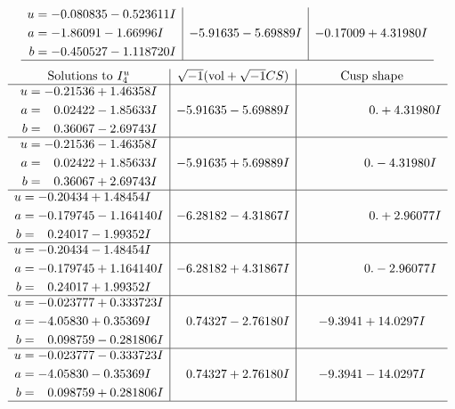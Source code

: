 \documentclass[1p]{elsarticle_modified}
\theoremstyle{definition}
\newcommand{\I}{\sqrt{-1}}
\begin{document}
$$\begin{array}{c|c|c}
\begin{aligned}
u &= -0.080835 - 0.523611 I \\
a &= -1.86091 - 1.66996 I \\
b &= -0.450527 - 1.118720 I\end{aligned}
 & -5.91635 - 5.69889 I & -0.17009 + 4.31980 I\\
 \hline 
 \end{array}$$\newpage$$\begin{array}{c|c|c}  
\text{Solutions to }I^u_{4}& \I (\text{vol} + \sqrt{-1}CS) & \text{Cusp shape}\\
 \hline 
\begin{aligned}
u &= -0.21536 + 1.46358 I \\
a &= \phantom{-}0.02422 - 1.85633 I \\
b &= \phantom{-}0.36067 - 2.69743 I\end{aligned}
 & -5.91635 - 5.69889 I & \phantom{-0.000000 -}0. + 4.31980 I \\ \hline\begin{aligned}
u &= -0.21536 - 1.46358 I \\
a &= \phantom{-}0.02422 + 1.85633 I \\
b &= \phantom{-}0.36067 + 2.69743 I\end{aligned}
 & -5.91635 + 5.69889 I & \phantom{-0.000000 } 0. - 4.31980 I \\ \hline\begin{aligned}
u &= -0.20434 + 1.48454 I \\
a &= -0.179745 - 1.164140 I \\
b &= \phantom{-}0.24017 - 1.99352 I\end{aligned}
 & -6.28182 - 4.31867 I & \phantom{-0.000000 -}0. + 2.96077 I \\ \hline\begin{aligned}
u &= -0.20434 - 1.48454 I \\
a &= -0.179745 + 1.164140 I \\
b &= \phantom{-}0.24017 + 1.99352 I\end{aligned}
 & -6.28182 + 4.31867 I & \phantom{-0.000000 } 0. - 2.96077 I \\ \hline\begin{aligned}
u &= -0.023777 + 0.333723 I \\
a &= -4.05830 + 0.35369 I \\
b &= \phantom{-}0.098759 - 0.281806 I\end{aligned}
 & \phantom{-}0.74327 - 2.76180 I & -9.3941 + 14.0297 I \\ \hline\begin{aligned}
u &= -0.023777 - 0.333723 I \\
a &= -4.05830 - 0.35369 I \\
b &= \phantom{-}0.098759 + 0.281806 I\end{aligned}
 & \phantom{-}0.74327 + 2.76180 I & -9.3941 - 14.0297 I\\
 \hline 
 \end{array}$$\newpage
\end{document}
